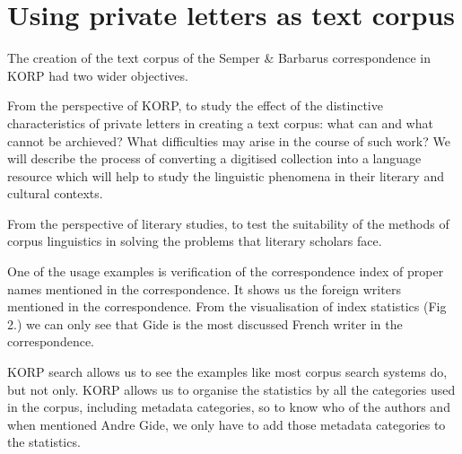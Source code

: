 \documentclass[runningheads]{llncs}
\begin{document}
\section{Using private letters as text corpus}

The creation of the text corpus of the Semper \& Barbarus correspondence in KORP had two wider objectives.  

From the perspective of KORP, to study the effect of the distinctive characteristics of private letters in creating a text corpus: what can and what cannot be archieved? What difficulties may arise in the course of such work? We will describe the process of converting a digitised collection into a language resource which will help to study the linguistic phenomena in their literary and cultural contexts.

From the perspective of literary studies, to test the suitability of the methods of corpus linguistics in solving the problems that literary scholars face.

One of the usage examples is verification of the correspondence index of proper names mentioned in the correspondence. It shows us the foreign writers mentioned in the correspondence. From the visualisation of index statistics (Fig 2.) we can only see that Gide is the most discussed French writer in the correspondence.  

KORP search allows us to see the examples like most corpus search systems do, but not only. KORP allows us to organise the statistics by all the categories used in the corpus, including metadata categories, so to know who of the authors and when mentioned Andre Gide, we only have to add those metadata categories to the statistics.
\end{document}
